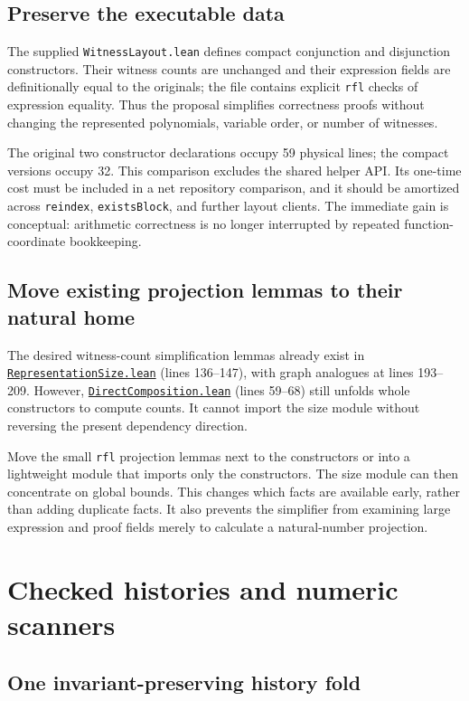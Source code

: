 \documentclass[11pt,letterpaper]{article}
\newcommand{\code}[1]{\nolinkurl{#1}}
\newcommand{\src}[2]{\href{https://github.com/VladimirReshetnikov/ProveIt/blob/60e9c5d620c6c387d932876cfa2d9376f64ea56c/Computability/DiophantineConsistency/Lean/DiophantineConsistency/#1.lean}{\nolinkurl{#1.lean}} (lines #2)}
\begin{document}
\subsection{Preserve the executable data}

The supplied \code{WitnessLayout.lean} defines compact conjunction and
disjunction constructors. Their witness counts are unchanged and their
expression fields are definitionally equal to the originals; the file
contains explicit \code{rfl} checks of expression equality. Thus the
proposal simplifies correctness proofs without changing the represented
polynomials, variable order, or number of witnesses.

The original two constructor declarations occupy 59 physical lines;
the compact versions occupy 32. This comparison excludes the shared
helper API. Its one-time cost must be included in a net repository
comparison, and it should be amortized across \code{reindex},
\code{existsBlock}, and further layout clients. The immediate gain is
conceptual: arithmetic correctness is no longer interrupted by repeated
function-coordinate bookkeeping.

\subsection{Move existing projection lemmas to their natural home}

The desired witness-count simplification lemmas already exist in
\src{RepresentationSize}{136--147}, with graph analogues at lines
193--209. However, \src{DirectComposition}{59--68} still unfolds whole
constructors to compute counts. It cannot import the size module without
reversing the present dependency direction.

Move the small \code{rfl} projection lemmas next to the constructors or
into a lightweight module that imports only the constructors. The size
module can then concentrate on global bounds. This changes which facts
are available early, rather than adding duplicate facts. It also prevents
the simplifier from examining large expression and proof fields merely
to calculate a natural-number projection.

\section{Checked histories and numeric scanners}

\subsection{One invariant-preserving history fold}
\end{document}
